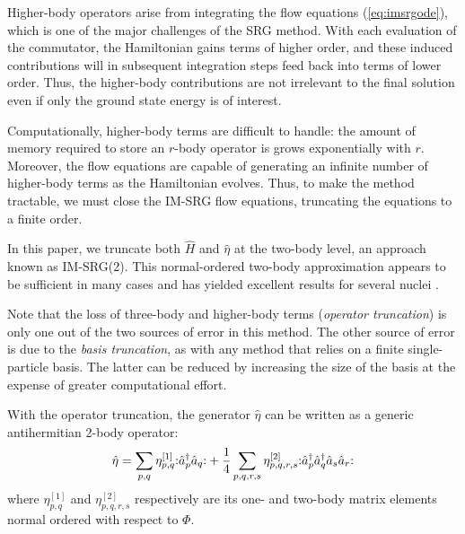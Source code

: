 Higher-body operators arise from integrating the flow equations (\ref{eq:imsrgode}), which is one of the major challenges of the SRG method.  With each evaluation of the commutator, the Hamiltonian gains terms of higher order, and these induced contributions will in subsequent integration steps feed back into terms of lower order.  Thus, the higher-body contributions are not irrelevant to the final solution even if only the ground state energy is of interest.

Computationally, higher-body terms are difficult to handle: the amount of memory required to store an $r$-body operator is grows exponentially with $r$.  Moreover, the flow equations are capable of generating an infinite number of higher-body terms as the Hamiltonian evolves.  Thus, to make the method tractable, we must close the IM-SRG flow equations, truncating the equations to a finite order.

In this paper, we truncate both $\hat{H}$ and $\hat{\eta}$ at the two-body level, an approach known as IM-SRG(2).  This normal-ordered two-body approximation appears to be sufficient in many cases and has yielded excellent results for several nuclei \cite{PhysRevLett.106.222502,PhysRevLett.109.052501,IMSRG}.

Note that the loss of three-body and higher-body terms (\textit{operator truncation}) is only one out of the two sources of error in this method.  The other source of error is due to the \textit{basis truncation}, as with any method that relies on a finite single-particle basis.  The latter can be reduced by increasing the size of the basis at the expense of greater computational effort.

With the operator truncation, the generator $\hat{\eta}$ can be written as a generic antihermitian 2-body operator:
\begin{align*}
\hat{\eta} = \sum_{p, q} \eta_{p, q}^{[1]} \mathopen: \hat a_p^\dagger \hat a_q \mathclose: +
\frac{1}{4} \sum_{p, q, r, s}\eta_{p, q, r, s}^{[2]} \mathopen: \hat a_p^\dagger \hat a_q^\dagger \hat a_s \hat a_r \mathclose:
\end{align*}
where $\eta_{p, q}^{[1]}$ and $ \eta_{p, q, r, s}^{[2]}$ respectively are its one- and two-body matrix elements normal ordered with respect to $\Phi$.

